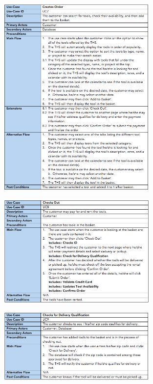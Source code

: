 \documentclass[fontsize=11pt]{extarticle}
\numberwithin{figure}{section} %
\numberwithin{table}{section}%
\begin{document}
\begin{figure}[H]
      \centering
      \includegraphics[trim = 0 0 0 0, clip, width=0.7\textwidth]{TempImg/UC7.png}
 \end{figure}

\begin{figure}[H]
      \centering
      \includegraphics[trim = 0 0 0 0, clip, width=0.7\textwidth]{TempImg/UC8.png}
 \end{figure}

\begin{figure}[H]
      \centering
      \includegraphics[trim = 0 0 0 0, clip, width=0.7\textwidth]{TempImg/UC9.png}
 \end{figure}
\end{document}
